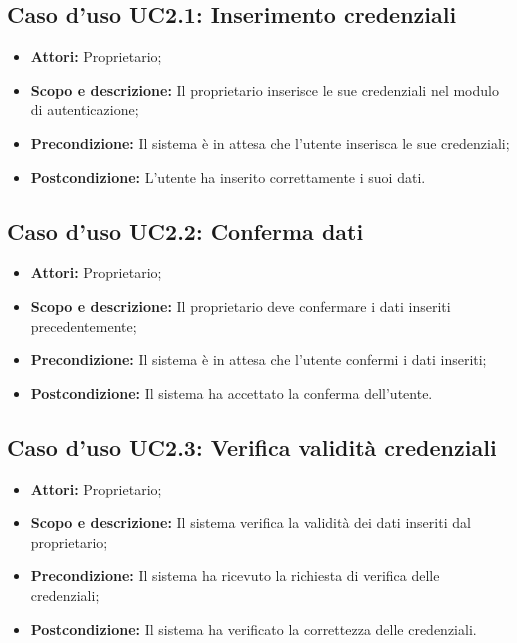 \subsection{Caso d'uso UC2.1: Inserimento credenziali}
\begin{itemize}
	\item \textbf{Attori:} Proprietario;
	\item \textbf{Scopo e descrizione:} Il proprietario inserisce le sue credenziali nel modulo di autenticazione;
	\item \textbf{Precondizione:} Il sistema è in attesa che l'utente inserisca le sue credenziali;
	\item \textbf{Postcondizione:} L'utente ha inserito correttamente i suoi dati.
\end{itemize}

\subsection{Caso d'uso UC2.2: Conferma dati}
\begin{itemize}
	\item \textbf{Attori:} Proprietario;
	\item \textbf{Scopo e descrizione:} Il proprietario deve confermare i dati inseriti precedentemente;
	\item \textbf{Precondizione:} Il sistema è in attesa che l'utente confermi i dati inseriti;
	\item \textbf{Postcondizione:} Il sistema ha accettato la conferma dell'utente.
\end{itemize}

\subsection{Caso d'uso UC2.3: Verifica validità credenziali}
\begin{itemize}
	\item \textbf{Attori:} Proprietario;
	\item \textbf{Scopo e descrizione:} Il sistema verifica la validità dei dati inseriti dal proprietario;
	\item \textbf{Precondizione:} Il sistema ha ricevuto la richiesta di verifica delle credenziali;
	\item \textbf{Postcondizione:} Il sistema ha verificato la correttezza delle credenziali.
\end{itemize}

